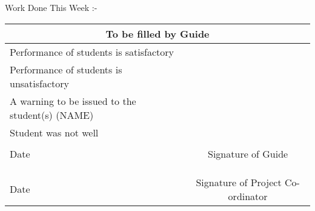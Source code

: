\documentclass[14pt]{extarticle}
\begin{document}
Work Done This Week :-  %


\begin{center}
    
    \begin{tabular}{|l|c|}
        \hline
        \multicolumn{2}{|c|}{To be filled by Guide} \\    
        \hline
        Performance of students is satisfactory & \\
        \hline
        Performance of students is unsatisfactory & \\
        \hline
        A warning to be issued to the student(s) (NAME) & \\
        \hline
        Student was not well & \\
        \hline
        \multicolumn{1}{|l}{} & \multicolumn{1}{c|}{} \\
        \multicolumn{1}{|l}{Date} & \multicolumn{1}{c|}{Signature of Guide} \\
        \hline
        \multicolumn{1}{l}{} & \multicolumn{1}{c}{} \\
        \multicolumn{1}{l}{} & \multicolumn{1}{c}{} \\
        \multicolumn{1}{l}{} & \multicolumn{1}{c}{} \\
        \multicolumn{1}{l}{Date} & \multicolumn{1}{c}{Signature of Project Co-ordinator} \\
    \end{tabular}
\end{center}
\end{document}
